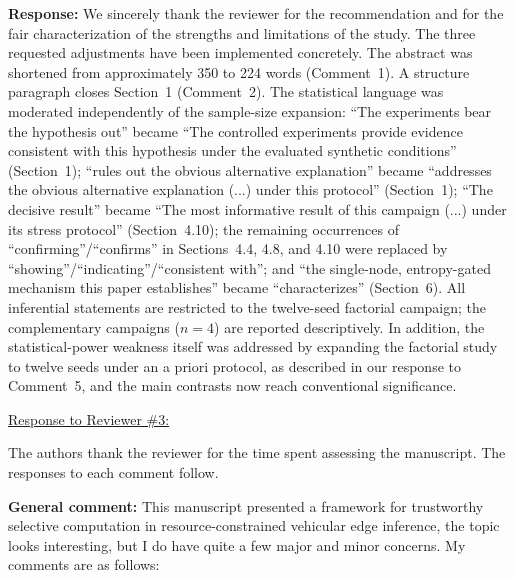 \documentclass[1p,12pt,authoryear]{elsarticle}
\begin{document}
\vspace{2mm}
\noindent \textbf{Response:} We sincerely thank the reviewer for the recommendation and for the fair characterization of the strengths and limitations of the study. The three requested adjustments have been implemented concretely. The abstract was shortened from approximately 350 to 224 words (Comment~1). A structure paragraph closes Section~1 (Comment~2). The statistical language was moderated independently of the sample-size expansion: ``The experiments bear the hypothesis out'' became ``The controlled experiments provide evidence consistent with this hypothesis under the evaluated synthetic conditions'' (Section~1); ``rules out the obvious alternative explanation'' became ``addresses the obvious alternative explanation (...) under this protocol'' (Section~1); ``The decisive result'' became ``The most informative result of this campaign (...) under its stress protocol'' (Section~4.10); the remaining occurrences of ``confirming''/``confirms'' in Sections~4.4, 4.8, and 4.10 were replaced by ``showing''/``indicating''/``consistent with''; and ``the single-node, entropy-gated mechanism this paper establishes'' became ``characterizes'' (Section~6). All inferential statements are restricted to the twelve-seed factorial campaign; the complementary campaigns ($n=4$) are reported descriptively. In addition, the statistical-power weakness itself was addressed by expanding the factorial study to twelve seeds under an a priori protocol, as described in our response to Comment~5, and the main contrasts now reach conventional significance.
\newpage


\begin{large}
\noindent \underline{Response to Reviewer \#3:}
\end{large}

\vspace{10pt}

\noindent The authors thank the reviewer for the time spent assessing the manuscript. The responses to each comment follow.

\vspace{2mm}
\noindent \textbf{General comment:} This manuscript presented a framework for trustworthy selective computation in resource-constrained vehicular edge inference, the topic looks interesting, but I do have quite a few major and minor concerns. My comments are as follows:
\end{document}
